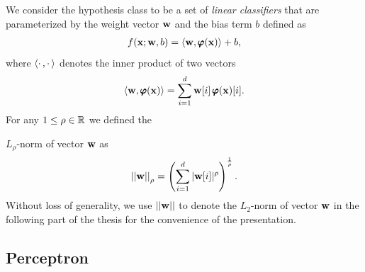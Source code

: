 We consider the hypothesis class to be a set of \textit{linear classifiers} that are parameterized by the weight vector $\mathbf {w}$ and the bias term $b$ defined as
\begin{align}
	f(\mathbf {x};\mathbf {w},b) = \langle \mathbf {w}, \pmb \varphi(\mathbf {x}) \rangle + b, \label{linearclassifier}
\end{align}
where $\langle \cdot\,, \cdot\, \rangle$ denotes the inner product of two vectors
\begin{align*}
	\langle \mathbf {w}, \pmb \varphi(\mathbf {x}) \rangle = \sum_{i=1}^{d}\mathbf {w}[i]\,\pmb \varphi(\mathbf {x})[i].
\end{align*}
For any $1\le\rho\in\mathbb{R}$ we defined the {$L_{\rho}$-norm of vector $\mathbf {w}$ as
\begin{align*}
	\left|\left| \mathbf {w} \right|\right|_{\rho} = \left(\sum_{i=1}^{d}|\mathbf {w}[i]|^{\rho}\right)^{\frac{1}{\rho}}.
\end{align*}
Without loss of generality, we use $||\mathbf {w}||$ to denote the $L_2$-norm of vector $\mathbf {w}$ in the following part of the thesis for the convenience of the presentation.


%
%
\iffalse
\subsection{Perceptron}\label{sc_perceptron}

}
